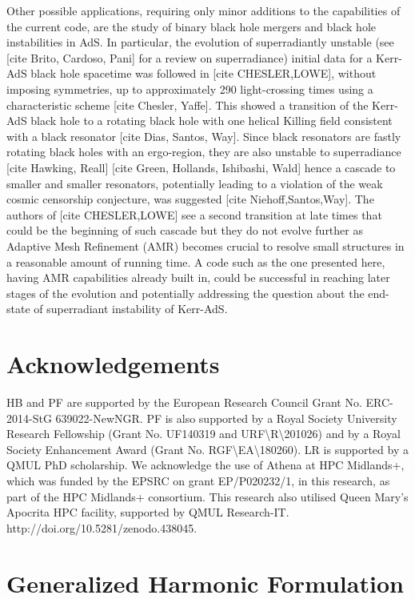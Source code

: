 \documentclass[a4paper,11pt]{article}
\numberwithin{equation}{section}
\begin{document}
Other possible applications, requiring only minor additions to the capabilities of the current code, are the study of binary black hole mergers and black hole instabilities in AdS. In particular, the evolution of superradiantly unstable (see [cite Brito, Cardoso, Pani] for a review on superradiance) initial data for a Kerr-AdS black hole spacetime was followed in [cite CHESLER,LOWE], without imposing symmetries, up to approximately 290 light-crossing times using a characteristic scheme [cite Chesler, Yaffe]. This showed a transition of the Kerr-AdS black hole to a rotating black hole with one helical Killing field consistent with a black resonator [cite Dias, Santos, Way]. Since black resonators are fastly rotating black holes with an ergo-region, they are also unstable to superradiance [cite  Hawking, Reall] [cite Green, Hollands, Ishibashi, Wald] hence a cascade to smaller and smaller resonators, potentially leading to a violation of the weak cosmic censorship conjecture, was suggested [cite Niehoff,Santos,Way]. The authors of [cite CHESLER,LOWE] see a second transition at late times that could be the beginning of such cascade but they do not evolve further as Adaptive Mesh Refinement (AMR) becomes crucial to resolve small structures in a reasonable amount of running time. A code such as the one presented here, having AMR capabilities already built in, could be successful in reaching later stages of the evolution and potentially addressing the question about the end-state of superradiant instability of Kerr-AdS.



\section*{Acknowledgements}
HB and PF are supported by the European Research Council Grant No. ERC-2014-StG 639022-NewNGR. PF is also supported by a Royal Society University Research Fellowship (Grant No. UF140319 and URF\textbackslash R\textbackslash 201026) and by a Royal Society Enhancement Award (Grant No. RGF\textbackslash EA\textbackslash 180260).  LR is supported by a QMUL PhD scholarship. We acknowledge the use of Athena at HPC Midlands+, which was funded by the EPSRC on 
grant EP/P020232/1, in this research, as part of the HPC Midlands+ consortium. This research also utilised Queen Mary's Apocrita HPC facility, supported by QMUL Research-IT. http://doi.org/10.5281/zenodo.438045.

\appendix
\setcounter{tocdepth}{1}
\section{Generalized Harmonic Formulation}
\label{sec:GHfor}
\end{document}
